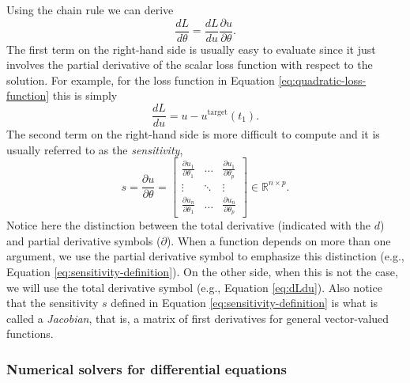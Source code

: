 Using the chain rule we can derive
\begin{equation} 
 \frac{dL}{d\theta} = \frac{dL}{du} \frac{\partial u}{\partial \theta}.
 \label{eq:dLdtheta_VJP}
\end{equation} 
The first term on the right-hand side is usually easy to evaluate since it just involves the partial derivative of the scalar loss function with respect to the solution.
For example, for the loss function in Equation \eqref{eq:quadratic-loss-function} this is simply
\begin{equation}
    \frac{dL}{du} = u - u^{\text{target}}(t_1).
    \label{eq:dLdu}
\end{equation}
The second term on the right-hand side is more difficult to compute and it is usually referred to as the \textit{sensitivity},
\begin{equation}
 s 
 = 
 \frac{\partial u}{\partial \theta} 
 =
 \begin{bmatrix}
   \frac{\partial u_1}{\partial \theta_1} & \dots & \frac{\partial u_1}{\partial \theta_p} \\
   \vdots & \ddots & \vdots \\
   \frac{\partial u_n}{\partial \theta_1} & \dots & \frac{\partial u_n}{\partial \theta_p}
 \end{bmatrix}
 \in \mathbb R^{n \times p}.
 \label{eq:sensitivity-definition}
\end{equation}
Notice here the distinction between the total derivative (indicated with the $d$) and partial derivative symbols ($\partial$). 
When a function depends on more than one argument, we use the partial derivative symbol to emphasize this distinction (e.g., Equation \eqref{eq:sensitivity-definition}). 
On the other side, when this is not the case, we will use the total derivative symbol (e.g., Equation \eqref{eq:dLdu}).
Also notice that the sensitivity $s$ defined in Equation \eqref{eq:sensitivity-definition} is what is called a \textit{Jacobian}, that is, a matrix of first derivatives for general vector-valued functions.

\subsubsection{Numerical solvers for differential equations}


